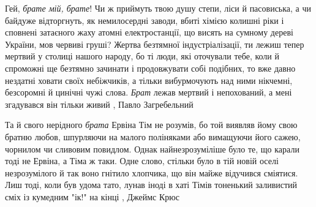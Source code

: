 Гей, \emph{брате мій, брате}! Чи ж приймуть твою душу степи, ліси й пасовиська, а чи
байдуже відторгнуть, як немилосердні заводи, вбиті хімією колишні ріки і
сповнені затаєного жаху атомні електростанції, що висять на сумному дереві
України, мов червиві груші? Жертва безтямної індустріалізації, ти лежиш тепер
мертвий у столиці нашого народу, бо ті люди, які оточували тебе, коли й
спроможні ще безтямно зачинати і продовжувати собі подібних, то вже давно
нездатні ховати своїх небіжчиків, а тільки вибурмочують над ними нікчемні,
безсоромні й цинічні чужі слова.  \emph{Брат} лежав мертвий і непохований, а мені
згадувався він тільки живий
, Павло Загребельний 

Та й свого нерідного \emph{брата} Ервіна Тім не розумів, бо той виявляв йому свою
братню любов, шпурляючи на малого поліняками або вимащуючи його сажею, чорнилом
чи сливовим повидлом. Однак найнезрозуміліше було те, що карали тоді не Ервіна,
а Тіма ж таки. Одне слово, стільки було в тій новій оселі незрозумілого й так
воно гнітило хлопчика, що він майже відучився сміятися. Лиш тоді, коли був
удома тато, лунав іноді в хаті Тімів тоненький заливистий сміх із кумедним
"ік!" на кінці
, Джеймс Крюс
